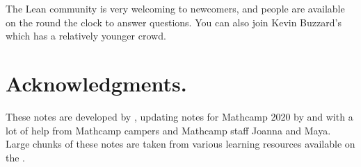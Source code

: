 \documentclass[letterpaper,10pt,english]{sphinxmanual}
\begin{document}
\sphinxAtStartPar
The Lean community is very welcoming to newcomers, and people are available on the  round the clock
to answer questions.
You can also join Kevin Buzzard’s  which has a relatively younger crowd.


\section{Acknowledgments.}
\label{\detokenize{introduction:acknowledgments}}
\sphinxAtStartPar
These notes are developed by , updating notes for Mathcamp 2020 by  and 
with a lot of help from Mathcamp campers and Mathcamp staff Joanna and Maya.
Large chunks of these notes are taken from various learning resources available on the .
\end{document}
